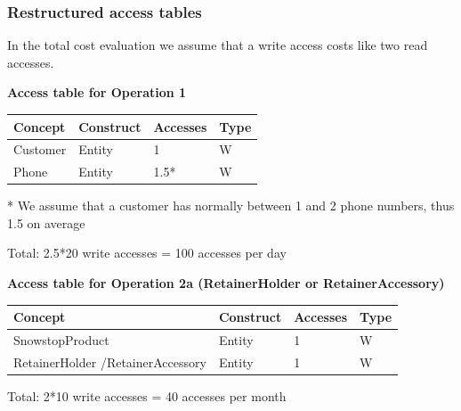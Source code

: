 \documentclass{article}[h]
\begin{document}
{{\pagebreak

\subsubsection{Restructured access tables}

In the total cost evaluation we assume that a write access costs like two read accesses.


\vspace{12px}

{\centering \textbf{Access table for Operation 1}\\}
\begin{table}[H]
  \def\arraystretch{1.10}%
  \centering
  \begin{tabular}{ | m{4cm} | m{4cm}| m{3cm} | m{2cm} |} 
    \hline
    {\textbf{\large Concept}} & {\textbf{\large Construct}} & {\textbf{\large Accesses}} & {\textbf{\large Type}} \\
    \hline
    \color[HTML]{3531FF} Customer & Entity & 1 & W \\ 
    \hline
    \color[HTML]{3531FF} Phone & Entity & 1.5* & W \\ 
    \hline
  \end{tabular}
  * \small{We assume that a customer has normally between 1 and 2 phone numbers, thus 1.5 on average}
\end{table}
Total: 2.5*20 write accesses = 100 accesses per day

\vspace{12px}

{\centering \textbf{Access table for Operation 2a (RetainerHolder or RetainerAccessory)}\\}
\begin{table}[H]
  \def\arraystretch{1.10}%
  \centering
  \begin{tabular}{ | m{4cm} | m{4cm}| m{3cm} | m{2cm} |} 
    \hline
    {\textbf{\large Concept}} & {\textbf{\large Construct}} & {\textbf{\large Accesses}} & {\textbf{\large Type}} \\
    \hline
    \color[HTML]{3531FF} SnowstopProduct & Entity & 1 & W \\ 
    \hline
    \color[HTML]{3531FF} RetainerHolder /\newline RetainerAccessory & Entity & 1 & W \\ 
    \hline
  \end{tabular}
\end{table}
Total: 2*10 write accesses = 40 accesses per month

}}
\end{document}
